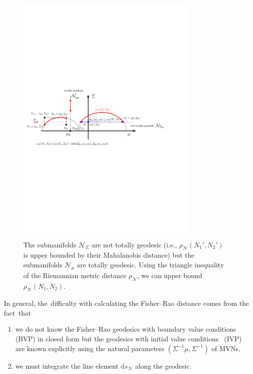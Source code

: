 \documentclass[entropy,article,accept,oneauthor,pdftex,entropy]{Definitions/mdpi}
\def\calN{\mathcal{N}}
\def\ds{\mathrm{d}s}
\begin{document}
\begin{figure}[H]

\includegraphics[width=0.8\textwidth]{FigIpe-MVNSubmanifoldUpperPlane.pdf}
%
\caption{
The submanifolds $\calN_{\Sigma}$ are not totally geodesic (i.e., $\rho_\calN(N_1',N_2')$ is upper bounded by their Mahalanobis distance) but the submanifolds $\calN_\mu$ are totally geodesic.
Using the triangle inequality of the Riemannian metric distance $\rho_\calN$, we can upper bound $\rho_\calN(N_1,N_2)$.
 \label{fig:totallynottotally}}
\end{figure}


In general, the~difficulty with calculating the Fisher--Rao distance comes from the fact~that 
\begin{enumerate}
\item  we do not know the Fisher–Rao geodesics with boundary value conditions (BVP) in closed form but the geodesics with initial value conditions~\cite{calvo1991explicit} (IVP) are known explicitly using the natural parameters $(\Sigma^{-1}\mu,\Sigma^{-1})$ of MVNs,
\item we must integrate the line element $\ds_\calN$ along the geodesic.
\end{enumerate}
\end{document}

